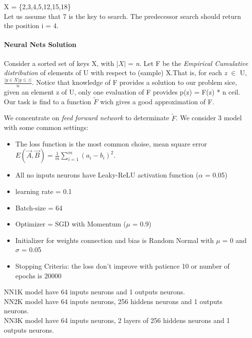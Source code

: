 \documentclass[]{article}
\begin{document}
	X = \{2,3,4,5,12,15,18\} \\
	
	Let us assume that 7 is the key to search. The predecessor search should return the position i = 4. \\
	
	\paragraph{Neural Nets Solution}
	Consider a sorted set of keys X, with $|X|$ = \textit{n}. Let F be the \textit{Empirical Cumulative distribution} of elements of U with respect to (sample) X.That is, for each \textit{z} $\in$ U, ${\frac{|y \in X | y \leq z|}{n}}$. Notice that knowledge of F provides a solution to our problem sice, given an element z of U, only one evaluation of F provides p(z) = {F(z) * n} ceil.
	Our task is find to a function $\tilde{F}$ wich gives a good approximation of F.
	
	We concentrate on \textit{feed forward  network} to determinate $\tilde{F}$.
	We consider 3 model with some common settings:
	\begin{itemize}
		\item The loss function is the most common choise, mean square error $E(\vec{A}, \vec{B}) = \frac{1}{m} \sum_{i=1}^{m}(a_{i} - b_{i})^{2} $.
		\item All no inputs neurons have Leaky-ReLU activation function ($\alpha$ = 0.05)
		\item learning rate = 0.1
		\item Batch-size = 64
		\item Optimizer = SGD with Momentum ($\mu$ = 0.9)
		\item Initializer for weights connection and bias is Random Normal with $\mu$ = 0 and $\sigma$ = 0.05
		\item Stopping Criteria: the loss don't improve with patience 10 or number of epochs is 20000
	\end{itemize}
	NN1K model have 64 inputs neurons and 1 outputs neurons. \\
	NN2K model have 64 inputs neurons, 256 hiddens neurons and 1 outputs neurons.\\
	NN3K model have 64 inputs neurons, 2 layers of 256 hiddens neurons and 1 outputs neurons.
	
\end{document}
